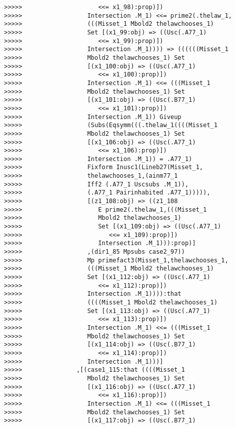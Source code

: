 \documentclass[12pt]{article}
\begin{document}
\begin{verbatim}
>>>>>                     <<= x1_98):prop)])
>>>>>                  Intersection .M_1) <<= prime2(.thelaw_1,
>>>>>                  (((Misset_1 Mbold2 thelawchooses_1)
>>>>>                  Set [(x1_99:obj) => ((Usc(.A77_1)
>>>>>                     <<= x1_99):prop)])
>>>>>                  Intersection .M_1)))) => ((((((Misset_1
>>>>>                  Mbold2 thelawchooses_1) Set
>>>>>                  [(x1_100:obj) => ((Usc(.A77_1)
>>>>>                     <<= x1_100):prop)])
>>>>>                  Intersection .M_1) <<= (((Misset_1
>>>>>                  Mbold2 thelawchooses_1) Set
>>>>>                  [(x1_101:obj) => ((Usc(.B77_1)
>>>>>                     <<= x1_101):prop)])
>>>>>                  Intersection .M_1)) Giveup
>>>>>                  (Subs(Eqsymm(((.thelaw_1((((Misset_1
>>>>>                  Mbold2 thelawchooses_1) Set
>>>>>                  [(x1_106:obj) => ((Usc(.A77_1)
>>>>>                     <<= x1_106):prop)])
>>>>>                  Intersection .M_1)) = .A77_1)
>>>>>                  Fixform Inusc1(Lineb27(Misset_1,
>>>>>                  thelawchooses_1,(ainm77_1
>>>>>                  Iff2 (.A77_1 Uscsubs .M_1)),
>>>>>                  (.A77_1 Pairinhabited .A77_1))))),
>>>>>                  [(z1_108:obj) => ((z1_108
>>>>>                     E prime2(.thelaw_1,(((Misset_1
>>>>>                     Mbold2 thelawchooses_1)
>>>>>                     Set [(x1_109:obj) => ((Usc(.A77_1)
>>>>>                        <<= x1_109):prop)])
>>>>>                     Intersection .M_1))):prop)]
>>>>>                  ,(dir1_85 Mpsubs case2_97))
>>>>>                  Mp primefact3(Misset_1,thelawchooses_1,
>>>>>                  (((Misset_1 Mbold2 thelawchooses_1)
>>>>>                  Set [(x1_112:obj) => ((Usc(.A77_1)
>>>>>                     <<= x1_112):prop)])
>>>>>                  Intersection .M_1)))):that
>>>>>                  ((((Misset_1 Mbold2 thelawchooses_1)
>>>>>                  Set [(x1_113:obj) => ((Usc(.A77_1)
>>>>>                     <<= x1_113):prop)])
>>>>>                  Intersection .M_1) <<= (((Misset_1
>>>>>                  Mbold2 thelawchooses_1) Set
>>>>>                  [(x1_114:obj) => ((Usc(.B77_1)
>>>>>                     <<= x1_114):prop)])
>>>>>                  Intersection .M_1)))]
>>>>>               ,[(case1_115:that ((((Misset_1
>>>>>                  Mbold2 thelawchooses_1) Set
>>>>>                  [(x1_116:obj) => ((Usc(.A77_1)
>>>>>                     <<= x1_116):prop)])
>>>>>                  Intersection .M_1) <<= (((Misset_1
>>>>>                  Mbold2 thelawchooses_1) Set
>>>>>                  [(x1_117:obj) => ((Usc(.B77_1)

\end{verbatim}
\end{document}
